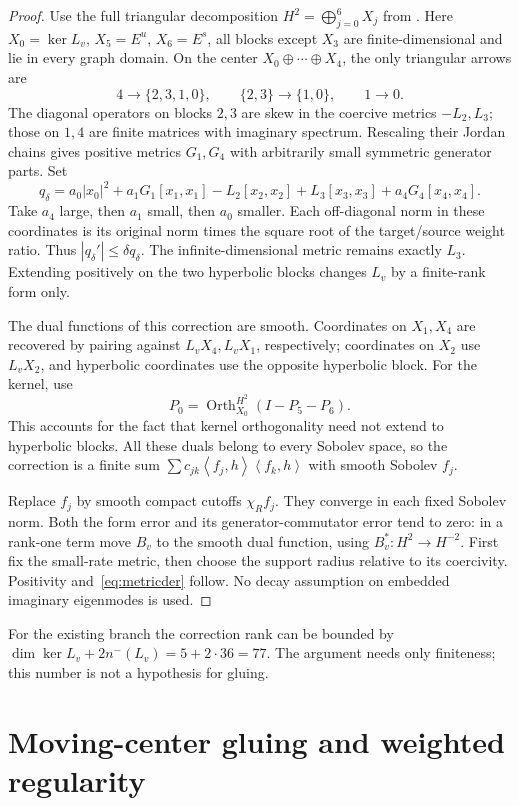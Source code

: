 \documentclass[11pt,a4paper]{article}
\theoremstyle{remark}\newtheorem{remark}[theorem]{Remark}
\newcommand{\ip}[2]{\left\langle #1,#2\right\rangle}
\begin{document}
\begin{proof}
Use the full triangular decomposition $H^2=\bigoplus_{j=0}^6X_j$ from \cite[Theorem 2.1]{LZ}. Here $X_0=\ker L_v$, $X_5=E^u$, $X_6=E^s$, all blocks except $X_3$ are finite-dimensional and lie in every graph domain. On the center $X_0\oplus\cdots\oplus X_4$, the only triangular arrows are
\[
 4\longrightarrow\{2,3,1,0\},\qquad
 \{2,3\}\longrightarrow\{1,0\},\qquad1\longrightarrow0.
\]
The diagonal operators on blocks $2,3$ are skew in the coercive metrics $-L_2,L_3$; those on $1,4$ are finite matrices with imaginary spectrum. Rescaling their Jordan chains gives positive metrics $G_1,G_4$ with arbitrarily small symmetric generator parts. Set
\[
 q_\delta=a_0|x_0|^2+a_1G_1[x_1,x_1]-L_2[x_2,x_2]
              +L_3[x_3,x_3]+a_4G_4[x_4,x_4].
\]
Take $a_4$ large, then $a_1$ small, then $a_0$ smaller. Each off-diagonal norm in these coordinates is its original norm times the square root of the target/source weight ratio. Thus $|q_\delta'|\le\delta q_\delta$. The infinite-dimensional metric remains exactly $L_3$. Extending positively on the two hyperbolic blocks changes $L_v$ by a finite-rank form only.

The dual functions of this correction are smooth. Coordinates on $X_1,X_4$ are recovered by pairing against $L_vX_4,L_vX_1$, respectively; coordinates on $X_2$ use $L_vX_2$, and hyperbolic coordinates use the opposite hyperbolic block. For the kernel, use
\[
 P_0=\operatorname{Orth}^{H^2}_{X_0}(I-P_5-P_6).
\]
This accounts for the fact that kernel orthogonality need not extend to hyperbolic blocks. All these duals belong to every Sobolev space, so the correction is a finite sum
$\sum c_{jk}\ip{f_j}{h}\ip{f_k}{h}$ with smooth Sobolev $f_j$.

Replace $f_j$ by smooth compact cutoffs $\chi_Rf_j$. They converge in each fixed Sobolev norm. Both the form error and its generator-commutator error tend to zero: in a rank-one term move $B_v$ to the smooth dual function, using $B_v^*:H^2\to H^{-2}$. First fix the small-rate metric, then choose the support radius relative to its coercivity. Positivity and~\eqref{eq:metricder} follow. No decay assumption on embedded imaginary eigenmodes is used.
\end{proof}

For the existing branch the correction rank can be bounded by
$\dim\ker L_v+2n^-(L_v)=5+2\cdot36=77$. The argument needs only finiteness; this number is not a hypothesis for gluing.

\section{Moving-center gluing and weighted regularity}
\end{document}
